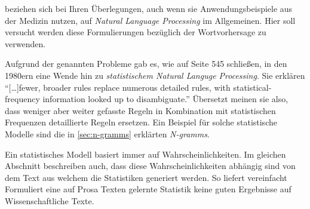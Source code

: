         \cite{jamia:introduction} beziehen sich bei Ihren Überlegungen, auch wenn sie Anwendungsbeispiele aus der Medizin nutzen, auf \emph{Natural Language Processing} im Allgemeinen. Hier soll versucht werden diese Formulierungen bezüglich der Wortvorhersage zu verwenden.
        
        Aufgrund der genannten Probleme gab es, wie \cite{jamia:introduction} auf Seite 545 schließen, in den 1980ern eine Wende hin zu \emph{statistischem Natural Languge Processing}. Sie erklären \enquote{[\dots]fewer, broader rules replace numerous detailed rules, with statistical-frequency information looked up to disambiguate.} Übersetzt meinen sie also, dass weniger aber weiter gefasste Regeln in Kombination mit statistischen Frequenzen detaillierte Regeln ersetzen. Ein Beispiel für solche statistische Modelle sind die in \autoref{sec:n-gramms} erklärten \emph{N-gramms}.
        
        Ein statistisches Modell basiert immer auf Wahrscheinlichkeiten. Im gleichen Abschnitt beschreiben \cite{jamia:introduction} auch, dass diese Wahrscheinlichkeiten abhängig sind von dem Text aus welchem die Statistiken generiert werden. So liefert vereinfacht Formuliert eine auf Prosa Texten gelernte Statistik keine guten Ergebnisse auf Wissenschaftliche Texte.